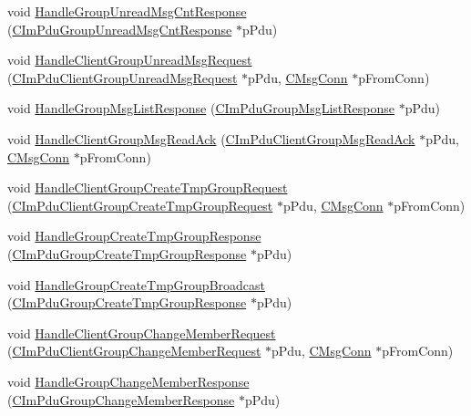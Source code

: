\begin{DoxyCompactItemize}
\item 
void \hyperlink{class_c_group_chat_a75da2b14112c988ce56f9ad796250320}{Handle\+Group\+Unread\+Msg\+Cnt\+Response} (\hyperlink{class_c_im_pdu_group_unread_msg_cnt_response}{C\+Im\+Pdu\+Group\+Unread\+Msg\+Cnt\+Response} $\ast$p\+Pdu)
\item 
void \hyperlink{class_c_group_chat_a40a7a5022dced40bb77ea71736376c8e}{Handle\+Client\+Group\+Unread\+Msg\+Request} (\hyperlink{class_c_im_pdu_client_group_unread_msg_request}{C\+Im\+Pdu\+Client\+Group\+Unread\+Msg\+Request} $\ast$p\+Pdu, \hyperlink{class_c_msg_conn}{C\+Msg\+Conn} $\ast$p\+From\+Conn)
\item 
void \hyperlink{class_c_group_chat_a220c7202c91ee051b54b1281a45337b8}{Handle\+Group\+Msg\+List\+Response} (\hyperlink{class_c_im_pdu_group_msg_list_response}{C\+Im\+Pdu\+Group\+Msg\+List\+Response} $\ast$p\+Pdu)
\item 
void \hyperlink{class_c_group_chat_a8679a76c672dd7812bde818556c890f2}{Handle\+Client\+Group\+Msg\+Read\+Ack} (\hyperlink{class_c_im_pdu_client_group_msg_read_ack}{C\+Im\+Pdu\+Client\+Group\+Msg\+Read\+Ack} $\ast$p\+Pdu, \hyperlink{class_c_msg_conn}{C\+Msg\+Conn} $\ast$p\+From\+Conn)
\item 
void \hyperlink{class_c_group_chat_aa3001031bdaf27813f821fbb48e82a2d}{Handle\+Client\+Group\+Create\+Tmp\+Group\+Request} (\hyperlink{class_c_im_pdu_client_group_create_tmp_group_request}{C\+Im\+Pdu\+Client\+Group\+Create\+Tmp\+Group\+Request} $\ast$p\+Pdu, \hyperlink{class_c_msg_conn}{C\+Msg\+Conn} $\ast$p\+From\+Conn)
\item 
void \hyperlink{class_c_group_chat_ae67a8451d59dc3c5af9479cf663ca44f}{Handle\+Group\+Create\+Tmp\+Group\+Response} (\hyperlink{class_c_im_pdu_group_create_tmp_group_response}{C\+Im\+Pdu\+Group\+Create\+Tmp\+Group\+Response} $\ast$p\+Pdu)
\item 
void \hyperlink{class_c_group_chat_a6edf67a544e50d564d909131e155d311}{Handle\+Group\+Create\+Tmp\+Group\+Broadcast} (\hyperlink{class_c_im_pdu_group_create_tmp_group_response}{C\+Im\+Pdu\+Group\+Create\+Tmp\+Group\+Response} $\ast$p\+Pdu)
\item 
void \hyperlink{class_c_group_chat_aa97a2a708b75315cb0a79e4021464a95}{Handle\+Client\+Group\+Change\+Member\+Request} (\hyperlink{class_c_im_pdu_client_group_change_member_request}{C\+Im\+Pdu\+Client\+Group\+Change\+Member\+Request} $\ast$p\+Pdu, \hyperlink{class_c_msg_conn}{C\+Msg\+Conn} $\ast$p\+From\+Conn)
\item 
void \hyperlink{class_c_group_chat_acf109fdc3c4d76ce5f59c314e05cbb68}{Handle\+Group\+Change\+Member\+Response} (\hyperlink{class_c_im_pdu_group_change_member_response}{C\+Im\+Pdu\+Group\+Change\+Member\+Response} $\ast$p\+Pdu)

\end{DoxyCompactItemize}
